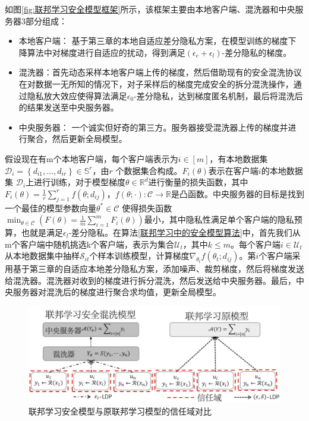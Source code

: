 如图\ref{fig:联邦学习安全模型框架}所示，该框架主要由本地客户端、混洗器和中央服务器3部分组成：
\begin{itemize}
  \item 本地客户端： 基于第三章的本地自适应差分隐私方案，在模型训练的梯度下降算法中对梯度进行自适应的扰动，得到满足$\left(\epsilon_{c}+\epsilon_{l}\right)$-差分隐私的梯度。
  \item 混洗器：首先动态采样本地客户端上传的梯度，然后借助现有的安全混洗协议在对数据一无所知的情况下，对子采样后的梯度完成安全的拆分混洗操作，通过隐私放大效应使得算法满足$\epsilon_{0}$-差分隐私，达到梯度匿名机制，最后将混洗后的结果发送至中央服务器。
  \item 中央服务器： 一个诚实但好奇的第三方。服务器接受混洗器上传的梯度并进行聚合，然后更新全局模型。
\end{itemize}

假设现在有m个本地客户端，每个客户端表示为$i \in[m]$，有本地数据集\\$\mathcal{D}_{i}=\left\{d_{i 1}, \ldots, d_{i r}\right\} \in \mathbb{S}^{r}$，由$r$ 个数据集合构成。$F_{i}(\theta)$表示在客户端$i$的本地数据集 $\mathcal{D}_{i}$上进行训练，对于模型梯度$\theta \in \mathbb{R}^{d}$进行衡量的损失函数，其中$F_{i}(\theta)=\frac{1}{r} \sum_{j=1}^{r} f\left(\theta ; d_{i j}\right)$，$f(\theta ; \cdot): \mathcal{C} \rightarrow \mathbb{R}$是凸函数。中央服务器的目标是找到一个最佳的模型参数向量$\theta^{*} \in \mathcal{C}$ 使得损失函数$\min _{\theta \in \mathcal{C}}\left(F(\theta)=\frac{1}{m} \sum_{i=1}^{m} F_{i}(\theta)\right)$最小，其中隐私性满足单个客户端的隐私预算，也就是满足$\epsilon_{l}$-差分隐私。在算法\ref{联邦学习中的安全模型算法}中，首先我们从m个客户端中随机挑选k个客户端，表示为集合$\mathcal{U}_{t}$，其中$k \leq m$。每个客户端$i \in \mathcal{U}_{t}$从本地数据集中抽样$\mathcal{S}_{i t}$个样本训练模型，计算梯度$\nabla_{\theta_{t}} f\left(\theta_{t} ; d_{i j}\right)$。第$i$个客户端采用基于第三章的自适应本地差分隐私方案，添加噪声、裁剪梯度，然后将梯度发送给混洗器。混洗器对收到的梯度进行拆分混洗，然后发送给中央服务器。最后，中央服务器对混洗后的梯度进行聚合求均值，更新全局模型。

\begin{figure}[!hbt]
\centering
	\includegraphics[scale=0.5]{fig2/C4/安全shuffle}%
	\caption{联邦学习安全模型与原联邦学习模型的信任域对比}
	\label{fig:联邦学习安全模型与原联邦学习模型的信任域对比}	
\end{figure}



